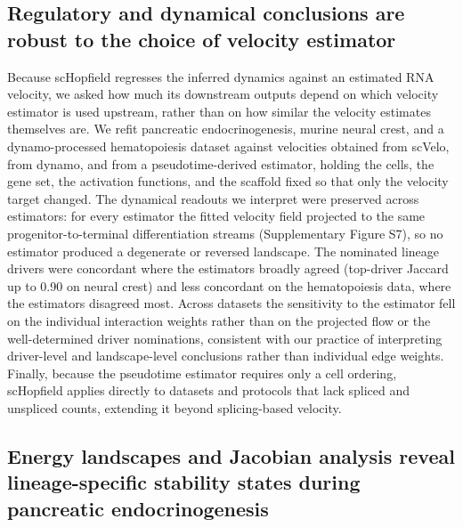 \documentclass[11pt]{article}
\begin{document}
\subsection*{Regulatory and dynamical conclusions are robust to the choice of velocity estimator}
Because scHopfield regresses the inferred dynamics against an estimated RNA velocity, we asked how much its downstream outputs depend on which velocity estimator is used upstream, rather than on how similar the velocity estimates themselves are. We refit pancreatic endocrinogenesis, murine neural crest, and a dynamo-processed hematopoiesis dataset against velocities obtained from scVelo, from dynamo, and from a pseudotime-derived estimator, holding the cells, the gene set, the activation functions, and the scaffold fixed so that only the velocity target changed. The dynamical readouts we interpret were preserved across estimators: for every estimator the fitted velocity field projected to the same progenitor-to-terminal differentiation streams (Supplementary Figure S7), so no estimator produced a degenerate or reversed landscape. The nominated lineage drivers were concordant where the estimators broadly agreed (top-driver Jaccard up to 0.90 on neural crest) and less concordant on the hematopoiesis data, where the estimators disagreed most. Across datasets the sensitivity to the estimator fell on the individual interaction weights rather than on the projected flow or the well-determined driver nominations, consistent with our practice of interpreting driver-level and landscape-level conclusions rather than individual edge weights. Finally, because the pseudotime estimator requires only a cell ordering, scHopfield applies directly to datasets and protocols that lack spliced and unspliced counts, extending it beyond splicing-based velocity.

\subsection*{Energy landscapes and Jacobian analysis reveal lineage-specific stability states during pancreatic endocrinogenesis}
\end{document}
